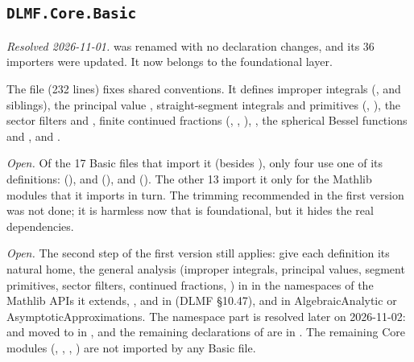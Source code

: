 \documentclass[11pt,a4paper]{article}
\newcommand{\resolved}[1]{\textit{Resolved #1.}}
\newcommand{\open}{\textit{Open.}}
\begin{document}
\subsection{\texorpdfstring{\texttt{DLMF.Core.Basic}}{DLMF.Core.Basic}}

\resolved{2026-11-01}  was renamed 
with no declaration changes, and its 36 importers were updated. It now belongs to the
foundational layer.

The file (232 lines) fixes shared conventions. It defines improper integrals
(,  and siblings), the principal value
, straight-segment integrals and primitives (,
), the sector filters  and , finite continued
fractions (, , ),
, the spherical Bessel functions  and ,
 and .

\open{} Of the 17 Basic files that import it (besides ), only four use one
of its definitions:  (),
 and 
(), and 
(). The other 13 import it only for the Mathlib modules that it imports in
turn. The trimming recommended in the first version was not done; it is harmless now that
 is foundational, but it hides the real dependencies.

\open{} The second step of the first version still applies: give each definition its natural
home, the general analysis (improper integrals, principal values, segment primitives, sector
filters, continued fractions, ) in  in the namespaces
of the Mathlib APIs it extends, ,  and  in
 (DLMF \S10.47), and  in AlgebraicAnalytic or
AsymptoticApproximations. The namespace part is resolved later on 2026-11-02:
 and  moved to  in
, and the remaining declarations of  are in
. The remaining Core modules
(, , ,
) are not imported by any Basic file.
\end{document}
